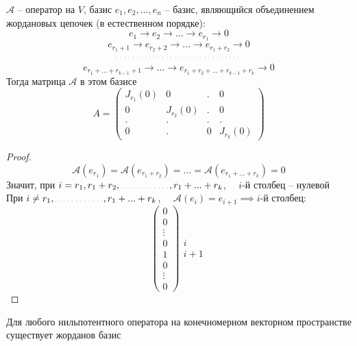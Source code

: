 \begin{lemma}
	$ \mathcal{A} $ -- оператор на $ V $, базис $ e_1, e_2, ..., e_n $ -- базис, являющийся объединением жордановых цепочек (в естественном порядке):
	$$ e_1 \to e_2 \to ... \to e_{r_1} \to 0 $$
	$$ e_{r_1 + 1} \to e_{r_2 + 2} \to ... \to e_{r_1 + r_2} \to 0 $$
	$$ \widedots $$
	$$ e_{r_1 + ... + r_{k - 1} + 1} \to ... \to e_{r_1 + r_2 + ... + r_{k - 1} + r_k} \to 0 $$
	Тогда матрица $ \mathcal{A} $ в этом базисе
	$$ A =
	\begin{pmatrix}
		J_{r_1}(0) & 0 & . & 0 \\
		0 & J_{r_2}(0) & . & 0 \\
		. & . & . & . \\
		0 & . & 0 & J_{r_k}(0)
	\end{pmatrix} $$
\end{lemma}

\begin{proof}
	$$ \mathcal{A}(e_{r_1}) = \mathcal{A}(e_{r_1 + r_2}) = ... = \mathcal{A}(e_{r_1 + ... + r_k}) = 0 $$
	Значит, при $ i = r_1, r_1 + r_2, \widedots[5em], r_1 + ... + r_k $, $ \quad i $-й столбец -- нулевой \\
	При $ i \ne r_1, \widedots[5em], r_1 + ... + r_k $, $ \quad \mathcal{A}(e_i) = e_{i + 1} \implies i $-й столбец:
	$$
	\begin{pmatrix}
		0 \\
		0 \\
		\vdots \\
		0 \\
		1 \\
		0 \\
		\vdots \\
		0
	\end{pmatrix}
	\begin{matrix}
		\ \\
		\ \\
		\ \\
		i \\
		i + 1 \\
		\ \\
		\ \\
		\
	\end{matrix} $$
\end{proof}

\begin{theorem}
	Для любого нильпотентного оператора на конечномерном векторном пространстве существует жорданов базис
\end{theorem}

